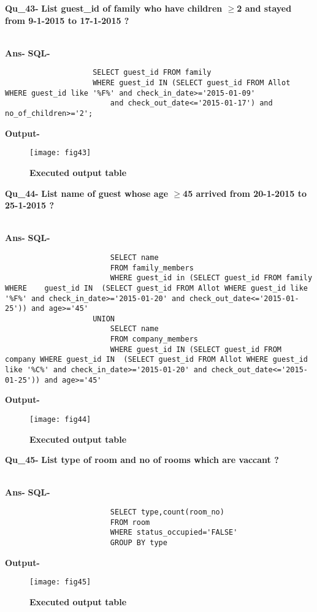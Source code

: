 \documentclass[a4,12pt]{report}
\begin{document}
\textbf{Qu\_43-}  \textbf{List guest\_id of family who have children $\geq $2 and stayed from 9-1-2015 to 17-1-2015 ?} \\\

\textbf{Ans-}		\textbf{SQL-}
\begin{lstlisting}
					SELECT guest_id FROM family 
					WHERE guest_id IN (SELECT guest_id FROM Allot WHERE guest_id like '%F%' and check_in_date>='2015-01-09' 
						and check_out_date<='2015-01-17') and no_of_children>='2';
\end{lstlisting}
\textbf{Output-} \\			   
\begin{figure}[hbtp]
\centering
\texttt{[image: fig43]}
\caption{\textbf{{\color{red}Executed output table}}}
\end{figure}

\newpage
\textbf{Qu\_44-}  \textbf{List name of guest whose age $ \geq $45 arrived from 20-1-2015 to 25-1-2015 ?} \\\

\textbf{Ans-}		\textbf{SQL-}
\begin{lstlisting}
						SELECT name 
						FROM family_members 
						WHERE guest_id in (SELECT guest_id FROM family WHERE 	guest_id IN  (SELECT guest_id FROM Allot WHERE guest_id like '%F%' and check_in_date>='2015-01-20' and check_out_date<='2015-01-25')) and age>='45' 
					UNION 
						SELECT name 
						FROM company_members 
						WHERE guest_id IN (SELECT guest_id FROM company WHERE guest_id IN  (SELECT guest_id FROM Allot WHERE guest_id like '%C%' and check_in_date>='2015-01-20' and check_out_date<='2015-01-25')) and age>='45' 

\end{lstlisting}
\textbf{Output-} \\			   
\begin{figure}[hbtp]
\centering
\texttt{[image: fig44]}
\caption{\textbf{{\color{red}Executed output table}}}
\end{figure}

\textbf{Qu\_45-}  \textbf{List type of room and no of rooms which are vaccant ?} \\\

\textbf{Ans-}		\textbf{SQL-}
\begin{lstlisting}
						SELECT type,count(room_no) 
						FROM room 
						WHERE status_occupied='FALSE'
						GROUP BY type
\end{lstlisting}
\textbf{Output-} \\			   
\begin{figure}[hbtp]
\centering
\texttt{[image: fig45]}
\caption{\textbf{{\color{red}Executed output table}}}
\end{figure}
\end{document}
